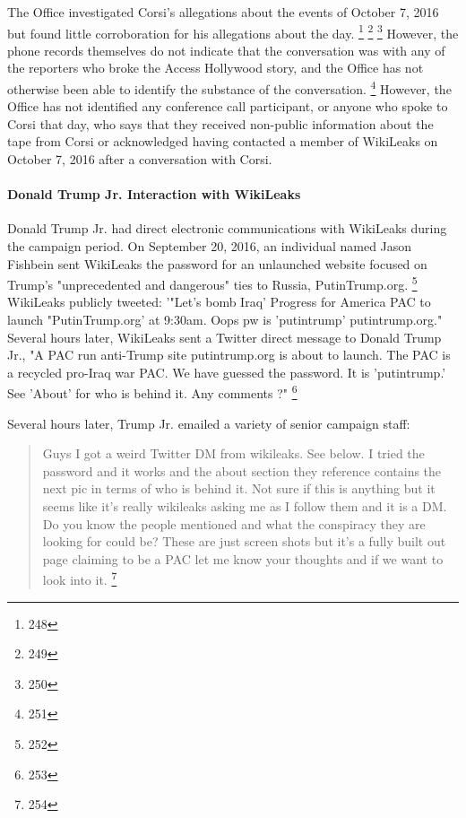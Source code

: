 The Office investigated Corsi's allegations about the events of October 7, 2016 but found little corroboration for his allegations about the day.%
\footnote{248}
\footnote{249}
\footnote{250}
However, the phone records themselves do not indicate that the conversation was with any of the reporters who broke the Access Hollywood story, and the Office has not otherwise been able to identify the substance of the conversation.
\footnote{251}
However, the Office has not identified any conference call participant, or anyone who spoke to Corsi that day, who says that they received non-public information about the tape from Corsi or acknowledged having contacted a member of WikiLeaks on October 7, 2016 after a conversation with Corsi.

\paragraph{Donald Trump Jr. Interaction with WikiLeaks}

Donald Trump Jr. had direct electronic communications with WikiLeaks during the campaign period.
On September 20, 2016, an individual named Jason Fishbein sent WikiLeaks the password for an unlaunched website focused on Trump's "unprecedented and dangerous" ties to Russia, PutinTrump.org.%
\footnote{252}
WikiLeaks publicly tweeted: '"Let's bomb Iraq'
Progress for America PAC to launch "PutinTrump.org' at 9:30am. Oops pw is 'putintrump' putintrump.org."
Several hours later, WikiLeaks sent a Twitter direct message to Donald Trump Jr., "A PAC run anti-Trump site putintrump.org is about to launch.
The PAC is a recycled pro-Iraq war PAC.
We have guessed the password.
It is 'putintrump.'
See 'About' for who is behind it.
Any comments ?"%
\footnote{253}

Several hours later, Trump Jr. emailed a variety of senior campaign staff:

\begin{quote}
Guys I got a weird Twitter DM from wikileaks.
See below.
I tried the password and it works and the about section they reference contains the next pic in terms of who is behind it.
Not sure if this is anything but it seems like it's really wikileaks asking me as I follow them and it is a DM.
Do you know the people mentioned and what the conspiracy they are looking for could be?
These are just screen shots but it's a fully built out page claiming to be a PAC let me know your thoughts and if we want to look into it.%
\footnote{254}
\end{quote}

